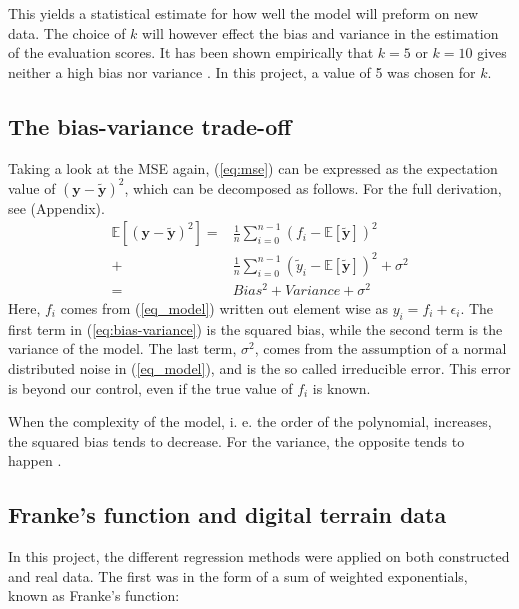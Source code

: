 This yields a statistical estimate for how well the model will preform on new data. The choice of $k$ will however effect the bias and variance in the estimation of the evaluation scores. It has been shown empirically that $k=5$ or $k=10$ gives neither a high bias nor variance \citep{james2013introduction}. In this project, a value of 5 was chosen for $k$. 

\subsection{The bias-variance trade-off}
Taking a look at the MSE again, (\ref{eq:mse}) can be expressed as the expectation value of $\left(\boldsymbol{y}-\boldsymbol{\tilde{y}}\right)^2$, which can be decomposed as follows. For the full derivation, see (Appendix). 
\begin{equation}\label{eq:bias-variance}
\begin{align*}
	\mathds{E}\left[\left(\boldsymbol{y}-\boldsymbol{\tilde{y}}\right)^2\right] 
	=&\frac{1}{n}\sum_{i=0}^{n-1}\left(f_i-\mathds{E}\left[\boldsymbol{\tilde{y}}\right]\right)^2 \\
	+&\frac{1}{n}\sum_{i=0}^{n-1}\left(\tilde{y}_i-\mathds{E}\left[\boldsymbol{\tilde{y}}\right]\right)^2 + \sigma^2 \\
	=& Bias^2 + Variance + \sigma^2
\end{align*}
\end{equation}
Here, $f_i$ comes from (\ref{eq_model}) written out element wise as $y_i = f_i + \epsilon_i$. The first term in (\ref{eq:bias-variance}) is the squared bias, while the second term is the variance of the model. The last term, $\sigma^2$, comes from the assumption of a normal distributed noise in (\ref{eq_model}), and is the so called irreducible error. This error is beyond our control, even if the true value of $f_i$ is known. 

When the complexity of the model, i. e. the order of the polynomial, increases, the squared bias tends to decrease. For the variance, the opposite tends to happen \citep{hastie2009elements}. 

\subsection{Franke's function and digital terrain data}
In this project, the different regression methods were applied on both constructed and real data. The first was in the form of a sum of weighted exponentials, known as Franke's function:

